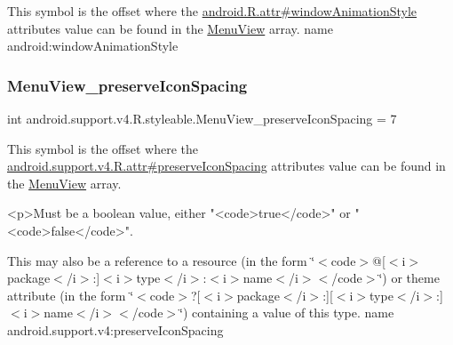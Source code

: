 This symbol is the offset where the \hyperlink{}{android.\+R.\+attr\#window\+Animation\+Style} attribute\textquotesingle{}s value can be found in the \hyperlink{classandroid_1_1support_1_1v4_1_1R_1_1styleable_a6f981f3b295d914b69b142c57cdfcabf}{Menu\+View} array.  name android\+:window\+Animation\+Style \mbox{\label{classandroid_1_1support_1_1v4_1_1R_1_1styleable_a7d9ee3b9e735dd16f51e9c76f6dc4fc5}} 
\subsubsection{\texorpdfstring{Menu\+View\+\_\+preserve\+Icon\+Spacing}{MenuView\_preserveIconSpacing}}
{\footnotesize\ttfamily int android.\+support.\+v4.\+R.\+styleable.\+Menu\+View\+\_\+preserve\+Icon\+Spacing = 7\hspace{0.3cm}{\ttfamily [static]}}

This symbol is the offset where the \hyperlink{classandroid_1_1support_1_1v4_1_1R_1_1attr_ae2c236de8d06fbd2175fc1c3631a8073}{android.\+support.\+v4.\+R.\+attr\#preserve\+Icon\+Spacing} attribute\textquotesingle{}s value can be found in the \hyperlink{classandroid_1_1support_1_1v4_1_1R_1_1styleable_a6f981f3b295d914b69b142c57cdfcabf}{Menu\+View} array.

\begin{DoxyVerb}      <p>Must be a boolean value, either "<code>true</code>" or "<code>false</code>".
\end{DoxyVerb}
 

This may also be a reference to a resource (in the form \char`\"{}$<$code$>$@\mbox{[}$<$i$>$package$<$/i$>$\+:\mbox{]}$<$i$>$type$<$/i$>$\+:$<$i$>$name$<$/i$>$$<$/code$>$\char`\"{}) or theme attribute (in the form \char`\"{}$<$code$>$?\mbox{[}$<$i$>$package$<$/i$>$\+:\mbox{]}\mbox{[}$<$i$>$type$<$/i$>$\+:\mbox{]}$<$i$>$name$<$/i$>$$<$/code$>$\char`\"{}) containing a value of this type.  name android.\+support.\+v4\+:preserve\+Icon\+Spacing \mbox{\label{classandroid_1_1support_1_1v4_1_1R_1_1styleable_a6e99b86cbaa0c61ca7598c15df537789}} 
